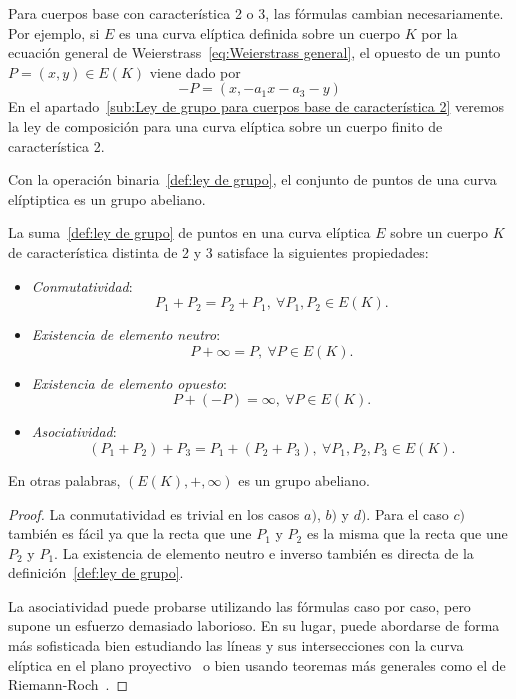\begin{nota}
	Para cuerpos base con característica 2 o 3, las fórmulas cambian necesariamente. Por ejemplo, si $E$ es una curva elíptica definida sobre un cuerpo $K$ por la ecuación general de Weierstrass~\eqref{eq:Weierstrass general}, el opuesto de un punto $P = (x, y) \in E(K)$ viene dado por
	$$
		- P = (x, -a_1 x - a_3 - y)
	$$
	En el apartado~\ref{sub:Ley de grupo para cuerpos base de característica 2} veremos la ley de composición para una curva elíptica sobre un cuerpo finito de característica 2.
\end{nota}

Con la operación binaria~\ref{def:ley de grupo}, el conjunto de puntos de una curva elíptiptica es un grupo abeliano.

\begin{teorema}\label{th:grupo abeliano}
	La suma~\ref{def:ley de grupo} de puntos en una curva elíptica $E$ sobre un cuerpo $K$ de característica distinta de 2 y 3 satisface la siguientes propiedades:
	\begin{itemize}
		\item \emph{Conmutatividad}: $$P_1 + P_2 = P_2 + P_1,\ \forall P_1, P_2 \in E(K).$$
		\item \emph{Existencia de elemento neutro}: $$P + \infty = P,\ \forall P \in E(K).$$
		\item \emph{Existencia de elemento opuesto}: $$P + (-P) = \infty,\ \forall P \in E(K).$$
		\item \emph{Asociatividad}: $$(P_1 + P_2) + P_3 = P_1 + (P_2 + P_3),\ \forall P_1, P_2, P_3 \in E(K).$$
	\end{itemize}
	En otras palabras, $(E(K), +, \infty)$ es un grupo abeliano.
\end{teorema}
\begin{proof}
La conmutatividad es trivial en los casos $a)$, $b)$ y $d)$. Para el caso $c)$ también es fácil ya que la recta que une $P_1$ y $P_2$ es la misma que la recta que une $P_2$ y $P_1$. La existencia de elemento neutro e inverso también es directa de la definición~\ref{def:ley de grupo}.

La asociatividad puede probarse utilizando las fórmulas caso por caso, pero supone un esfuerzo demasiado laborioso. En su lugar, puede abordarse de forma más sofisticada bien estudiando las líneas y sus intersecciones con la curva elíptica en el plano proyectivo~\cite[sec. 2.4]{Washington:2008} o bien usando teoremas más generales como el de Riemann-Roch~\cite[teo. III.3.4.e]{Silverman:2009}.
\end{proof}

